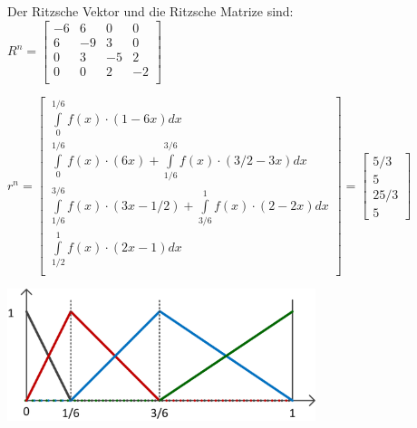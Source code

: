 \begin{minipage}{10cm}
Der Ritzsche Vektor und die Ritzsche Matrize sind:\\

$R^n=
\begin{bmatrix}
		-6 & 6 & 0 & 0\\
		6 & -9 & 3 & 0\\
		0 & 3 & -5 & 2\\
		0 & 0 & 2 & -2\\
\end{bmatrix}$

$
r^n=\begin{bmatrix}
		\int\limits_{0}^{1/6}{f(x)\cdot(1-6x)}dx\\
		\int\limits_{0}^{1/6}{f(x)\cdot(6x)}+\int\limits_{1/6}^{3/6}{f(x)\cdot(3/2-3x)}dx\\
		\int\limits_{1/6}^{3/6}{f(x)\cdot(3x-1/2)}+\int\limits_{3/6}^{1}{f(x)\cdot(2-2x)}dx\\
		\int\limits_{1/2}^{1}{f(x)\cdot(2x-1)}dx\\
\end{bmatrix}=
\begin{bmatrix}
	5/3\\
	5\\
	25/3\\
	5
\end{bmatrix}
$\end{minipage}
\hfill
\begin{minipage}{9cm}
\includegraphics[width=9cm]{Content/Numerik/FEMHand}
\end{minipage}\\

